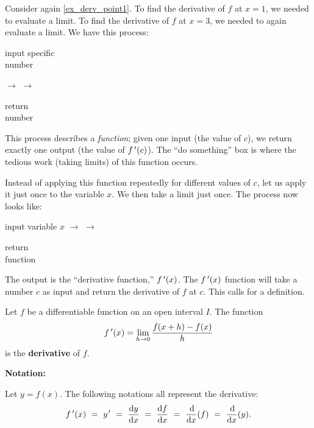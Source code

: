Consider again \autoref{ex_derv_point1}. To find the derivative of $f$ at $x=1$, we needed to evaluate a limit. To find the derivative of $f$ at $x=3$, we needed to again evaluate a limit. We have this process:
\begin{center}
\iflatexml
{}
\else
\parbox{\iflatexml75pt\else\widthof{input specific}\fi}{\centering input specific\iflatexml\else\\\fi number }
\fi
$\longrightarrow$
$\longrightarrow$
\parbox{\iflatexml80pt\else\widthof{number $\fp(c)$}\fi}{\centering return\\number {}}
\end{center}

This process describes a \emph{function}; given one input (the value of $c$), we return exactly one output (the value of $\fp(c)$). The ``do something'' box is where the tedious work (taking limits) of this function occurs. 

Instead of applying this function repeatedly for different values of $c$, let us apply it just once to the variable $x$. We then take a limit just once. The process now looks like:
\begin{center}
input variable $x$
$\longrightarrow$
$\longrightarrow$
\parbox{\iflatexml85pt\else\widthof{function $\fp(x)$}\fi}{\centering return\\function {}}
\end{center}

The output is the ``derivative function,'' $\fp(x)$. The $\fp(x)$ function will take a number $c$ as input and return the derivative of $f$ at $c$. This calls for a definition.

\begin{definition}\label{def:the_derivative}%
Let $f$ be a differentiable function on an open interval $I$. The function
\[f\,'(x) = \lim_{h\to 0} \frac{f(x+h)-f(x)}{h}\]
is the \textbf{derivative} of $f$.\bigbreak

\textbf{Notation:}

Let $y = f(x)$. The following notations all represent the derivative:
\[\fp(x)\ =\ y\primeskip'\ =\ \frac{\dd y}{\dd x}\ =\ \frac{\dd f}{\dd x}\ =\ \frac{\dd}{\dd x}(f)\ =\ \frac{\dd}{\dd x}(y).\]
\end{definition}

